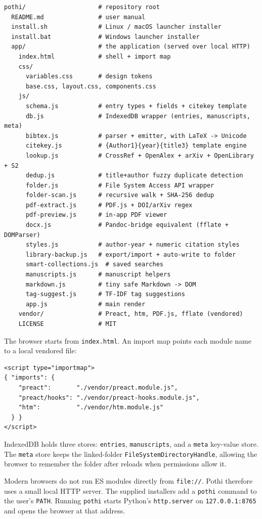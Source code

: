 \documentclass[10pt,twocolumn]{article}
\begin{document}
\begin{lstlisting}
pothi/                    # repository root
  README.md               # user manual
  install.sh              # Linux / macOS launcher installer
  install.bat             # Windows launcher installer
  app/                    # the application (served over local HTTP)
    index.html            # shell + import map
    css/
      variables.css       # design tokens
      base.css, layout.css, components.css
    js/
      schema.js           # entry types + fields + citekey template
      db.js               # IndexedDB wrapper (entries, manuscripts, meta)
      bibtex.js           # parser + emitter, with LaTeX -> Unicode
      citekey.js          # {Author1}{year}{title3} template engine
      lookup.js           # CrossRef + OpenAlex + arXiv + OpenLibrary + S2
      dedup.js            # title+author fuzzy duplicate detection
      folder.js           # File System Access API wrapper
      folder-scan.js      # recursive walk + SHA-256 dedup
      pdf-extract.js      # PDF.js + DOI/arXiv regex
      pdf-preview.js      # in-app PDF viewer
      docx.js             # Pandoc-bridge equivalent (fflate + DOMParser)
      styles.js           # author-year + numeric citation styles
      library-backup.js   # export/import + auto-write to folder
      smart-collections.js  # saved searches
      manuscripts.js      # manuscript helpers
      markdown.js         # tiny safe Markdown -> DOM
      tag-suggest.js      # TF-IDF tag suggestions
      app.js              # main render
    vendor/               # Preact, htm, PDF.js, fflate (vendored)
    LICENSE               # MIT
\end{lstlisting}

The browser starts from \texttt{index.html}. An import map points each module name to a local vendored file:

\begin{lstlisting}
<script type="importmap">
{ "imports": {
    "preact":       "./vendor/preact.module.js",
    "preact/hooks": "./vendor/preact-hooks.module.js",
    "htm":          "./vendor/htm.module.js"
  } }
</script>
\end{lstlisting}

IndexedDB holds three stores: \texttt{entries}, \texttt{manuscripts}, and a \texttt{meta} key-value store. The \texttt{meta} store keeps the linked-folder \texttt{FileSystemDirectoryHandle}, allowing the browser to remember the folder after reloads when permissions allow it.

Modern browsers do not run ES modules directly from \texttt{file://}. Pothi therefore uses a small local HTTP server. The supplied installers add a \texttt{pothi} command to the user's \texttt{PATH}. Running \texttt{pothi} starts Python's \texttt{http.server} on \texttt{127.0.0.1:8765} and opens the browser at that address.
\end{document}
